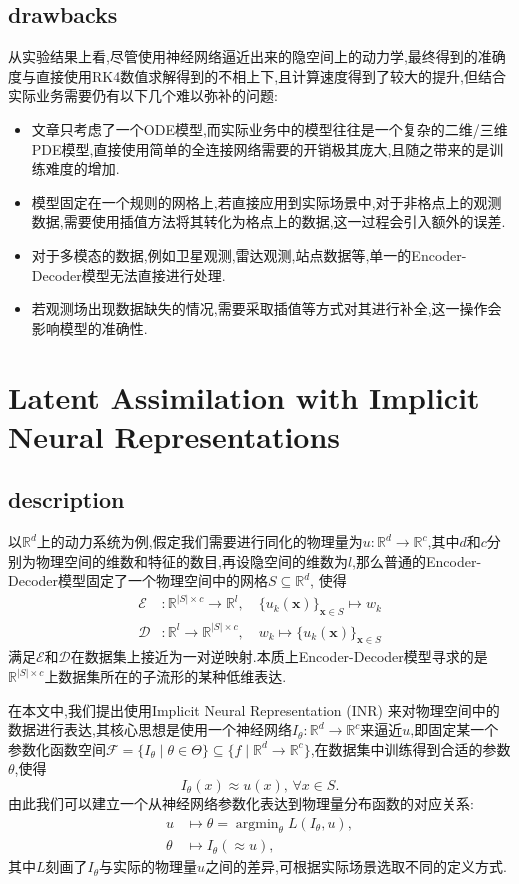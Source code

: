 \documentclass{article}
\newcommand{\mR}{\mathbb{R}}
\newcommand{\mF}{\mathcal{F}}
\newcommand{\mE}{\mathcal{E}}
\newcommand{\mD}{\mathcal{D}}
\DeclareMathOperator*{\argmin}{argmin}
\begin{document}
\subsection{drawbacks}
从实验结果上看,尽管使用神经网络逼近出来的隐空间上的动力学,最终得到的准确度与直接使用RK4数值求解得到的不相上下,且计算速度得到了较大的提升,但结合实际业务需要仍有以下几个难以弥补的问题:
\begin{itemize}
	\item 文章只考虑了一个ODE模型,而实际业务中的模型往往是一个复杂的二维/三维PDE模型,直接使用简单的全连接网络需要的开销极其庞大,且随之带来的是训练难度的增加.
	\item 模型固定在一个规则的网格上,若直接应用到实际场景中,对于非格点上的观测数据,需要使用插值方法将其转化为格点上的数据,这一过程会引入额外的误差.
	\item 对于多模态的数据,例如卫星观测,雷达观测,站点数据等,单一的Encoder-Decoder模型无法直接进行处理.
	\item 若观测场出现数据缺失的情况,需要采取插值等方式对其进行补全,这一操作会影响模型的准确性.
\end{itemize}
\section{Latent Assimilation with Implicit Neural Representations}
\subsection{description}
以$\mR^d$上的动力系统为例,假定我们需要进行同化的物理量为$u:\mR^d\to\mR^c$,其中$d$和$c$分别为物理空间的维数和特征的数目,再设隐空间的维数为$l$,那么普通的Encoder-Decoder模型固定了一个物理空间中的网格$S\subseteq\mR^d$, 使得
\begin{align*}
	\mE & :\mR^{|S|\times c}\to\mR^l,\quad\{u_k(\bm x)\}_{\bm x\in S}\mapsto w_k \\
	\mD & :\mR^l\to\mR^{|S|\times c},\quad w_k\mapsto\{u_k(\bm x)\}_{\bm x\in S}
\end{align*}
满足$\mE$和$\mD$在数据集上接近为一对逆映射.本质上Encoder-Decoder模型寻求的是$\mR^{|S|\times c}$上数据集所在的子流形的某种低维表达.

在本文中,我们提出使用Implicit Neural Representation (INR) 来对物理空间中的数据进行表达,其核心思想是使用一个神经网络$I_\theta:\mR^d\to\mR^c$来逼近$u$,即固定某一个参数化函数空间$\mF=\{I_\theta\mid\theta\in\Theta\}\subseteq\{f\mid\mR^d\to\mR^c\}$,在数据集中训练得到合适的参数$\theta$,使得
\[I_\theta(x)\approx u(x),\,\forall x\in S.\]
由此我们可以建立一个从神经网络参数化表达到物理量分布函数的对应关系:
\begin{align*}
	u      & \mapsto\theta=\argmin_\theta L(I_\theta,u), \\
	\theta & \mapsto I_\theta(\approx u),
\end{align*}
其中$L$刻画了$I_\theta$与实际的物理量$u$之间的差异,可根据实际场景选取不同的定义方式.
\end{document}
